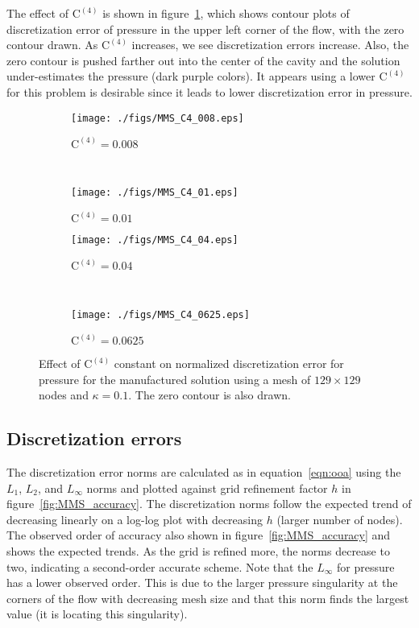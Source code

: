 \documentclass[10pt, letterpaper]{article}
\newcommand{\fig}[1]{figure~\ref{#1}}
\newcommand{\eqn}[1]{equation~\eqref{#1}}
\newcommand{\mesh}[1]{${#1} \times {#1}$}
\begin{document}
The effect of $\mathrm{C^{(4)}}$ is shown in \fig{fig:MMS_C4}, which shows contour
plots of discretization error of pressure in the upper left corner of the flow, with
the zero contour drawn.  As $\mathrm{C^{(4)}}$ increases, we see discretization 
errors increase.  Also, the zero contour is pushed farther out into the center of
the cavity and the solution under-estimates the pressure (dark purple colors).
It appears using a lower $\mathrm{C^{(4)}}$ for this problem is desirable since
it leads to lower discretization error in pressure.

\begin{figure}[h]
	\centering
	\begin{subfigure}[b]{0.475\textwidth}
		\centering
		\texttt{[image: ./figs/MMS\_C4\_008.eps]}
		\caption{$\mathrm{C^{(4)}} = 0.008$}
	\end{subfigure}
	~
	\begin{subfigure}[b]{0.475\textwidth}
		\centering
		\texttt{[image: ./figs/MMS\_C4\_01.eps]}
		\caption{$\mathrm{C^{(4)}} = 0.01$}
	\end{subfigure}
	
	\begin{subfigure}[b]{0.475\textwidth}
		\centering
		\texttt{[image: ./figs/MMS\_C4\_04.eps]}
		\caption{$\mathrm{C^{(4)}} = 0.04$}
	\end{subfigure}
	~
	\begin{subfigure}[b]{0.475\textwidth}
		\centering
		\texttt{[image: ./figs/MMS\_C4\_0625.eps]}
		\caption{$\mathrm{C^{(4)}} = 0.0625$}
	\end{subfigure}
	\caption{Effect of $\mathrm{C^{(4)}}$ constant on normalized discretization
		error for pressure for the manufactured solution using a mesh of
		\mesh{129} nodes and $\kappa = 0.1$.  The zero contour is also drawn.}
	\label{fig:MMS_C4}
\end{figure}


\subsection{Discretization errors}

The discretization error norms are calculated as in \eqn{eqn:ooa} using
the $L_1$, $L_2$, and $L_\infty$ norms and plotted against grid refinement 
factor $h$ in \fig{fig:MMS_accuracy}.  The discretization norms follow the expected
trend of decreasing linearly on a log-log plot with decreasing $h$ 
(larger number of nodes).
The observed order of accuracy also shown in \fig{fig:MMS_accuracy}
and shows the expected trends.  As the
grid is refined more, the norms decrease to two, indicating a second-order
accurate scheme.  Note that the $L_\infty$ for pressure has a lower observed order.
This is due to the larger pressure singularity at the corners of the flow
with decreasing mesh size and that this norm finds the largest value (it is locating
this singularity).
\end{document}
